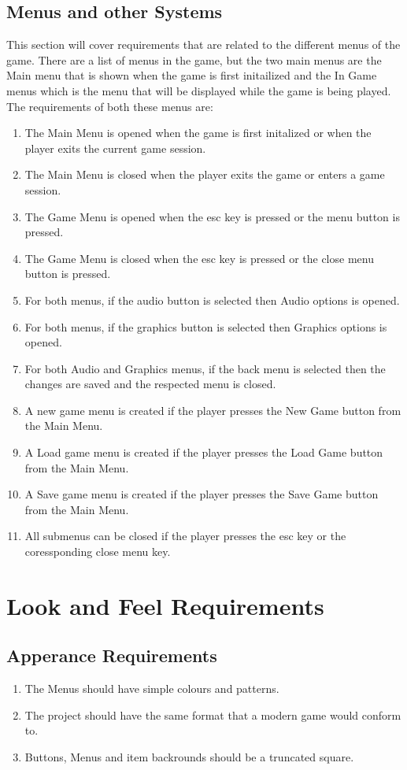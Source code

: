 \documentclass{article}
\begin{document}
\subsection{Menus and other Systems}
\quad This section will cover requirements that are related to the different menus of the game. There are a list of menus in the game, but the two main menus are the Main menu that is shown when the game is first initailized and the In Game menus which is the menu that will be displayed while the game is being played. The requirements of both these menus are:
\begin{enumerate}[{MR}1. ]
	\item The Main Menu is opened when the game is first initalized or when the player exits the current game session.
	\item The Main Menu is closed when the player exits the game or enters a game session.
	\item The Game Menu is opened when the esc key is pressed or the menu button is pressed.
	\item The Game Menu is closed when the esc key is pressed or the close menu button is pressed.
	\item For both menus, if the audio button is selected then Audio options is opened.
	\item For both menus, if the graphics button is selected then Graphics options is opened.
	\item For both Audio and Graphics menus, if the back menu is selected then the changes are saved and the respected menu is closed.
	\item A new game menu is created if the player presses the New Game button from the Main Menu.
	\item A Load game menu is created if the player presses the Load Game button from the Main Menu.
	\item A Save game menu is created if the player presses the Save Game button from the Main Menu.
	\item All submenus can be closed if the player presses the esc key or the coressponding close menu key.	
\end{enumerate}
\section{Look and Feel Requirements}
\subsection{Apperance Requirements}
\begin{enumerate}[{APPR}1. ]
	\item The Menus should have simple colours and patterns.
	\item The project should have the same format that a modern game would conform to.
	\item Buttons, Menus and item backrounds should be a truncated square. 
\end{enumerate}
\end{document}
